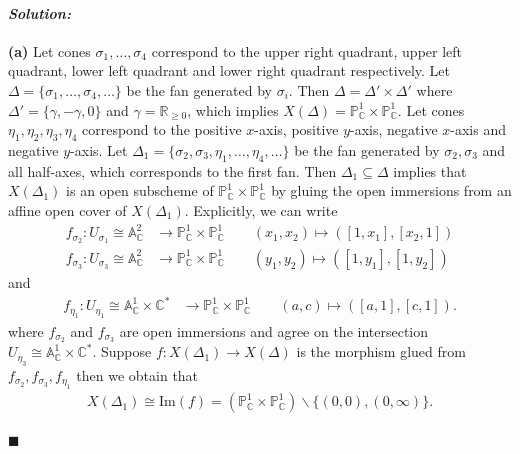 \documentclass[12pt, a4paper]{article}
\newenvironment{solution}
  {\paragraph{\textit{Solution:}}\par\medskip}
  {\hfill$\blacksquare$\vspace{0.1cm}}
\begin{document}
\begin{solution}
    \textbf{(a)} 
    Let cones $\sigma_1,\dots,\sigma_4$ correspond to the upper right quadrant, upper left quadrant, lower left quadrant and lower right quadrant respectively.
    Let $\Delta = \{\sigma_1,\dots,\sigma_4,\dots\}$ be the fan generated by $\sigma_i$. Then $\Delta = \Delta'\times \Delta'$ where $\Delta' = \{\gamma,-\gamma,0\}$ and $\gamma = \mathbb{R}_{\ge 0}$, which implies 
    $X(\Delta)= \mathbb{P}^1_{\mathbb{C}} \times \mathbb{P}^1_{\mathbb{C}}$. Let cones $\eta_1,\eta_2,\eta_3,\eta_4$ correspond to the positive $x$-axis, positive $y$-axis, negative $x$-axis and negative $y$-axis. 
    Let $\Delta_1=\{\sigma_2,\sigma_3,\eta_1,\dots,\eta_4,\dots\}$ be the fan generated by $\sigma_2,\sigma_3$ and all half-axes, which corresponds to the first fan. 
    Then $\Delta_1\subseteq \Delta$ implies that $X(\Delta_1)$ is an open subscheme of $\mathbb{P}^1_{\mathbb{C}} \times \mathbb{P}^1_{\mathbb{C}}$ by gluing the open immersions from an affine open cover of $X(\Delta_1)$. 
    Explicitly, we can write 
    \begin{align*}
        f_{\sigma_2}:U_{\sigma_1}\cong \mathbb{A}^2_\mathbb{C} &\to \mathbb{P}^1_{\mathbb{C}} \times \mathbb{P}^1_{\mathbb{C}} \qquad (x_1,x_2)\mapsto ([1,x_1],[x_2,1])\\
        f_{\sigma_3}:U_{\sigma_3}\cong \mathbb{A}^2_\mathbb{C} &\to \mathbb{P}^1_{\mathbb{C}} \times \mathbb{P}^1_{\mathbb{C}}  \qquad (y_1,y_2)\mapsto ([1,y_1],[1,y_2])
    \end{align*}
    and 
    \begin{align*}
        f_{\eta_1}:U_{\eta_1}\cong \mathbb{A}_{\mathbb{C}}^1\times \mathbb{C}^* &\to \mathbb{P}^1_{\mathbb{C}} \times \mathbb{P}^1_{\mathbb{C}} \qquad (a,c) \mapsto ([a,1],[c,1]).
    \end{align*}
    where $f_{\sigma_2}$ and $f_{\sigma_3}$ are open immersions and agree on the intersection $U_{\eta_3}\cong \mathbb{A}_{\mathbb{C}}^1\times \mathbb{C}^*$. Suppose 
    $f:X(\Delta_1)\to X(\Delta)$ is 
    the morphism glued from $f_{\sigma_2},f_{\sigma_3},f_{\eta_1}$ then we obtain that 
    \begin{align*}
        X(\Delta_1) \cong \text{Im}(f) = (\mathbb{P}^1_{\mathbb{C}} \times \mathbb{P}^1_{\mathbb{C}})\backslash \{(0,0),(0,\infty)\}.
    \end{align*}


\end{solution}
\end{document}
